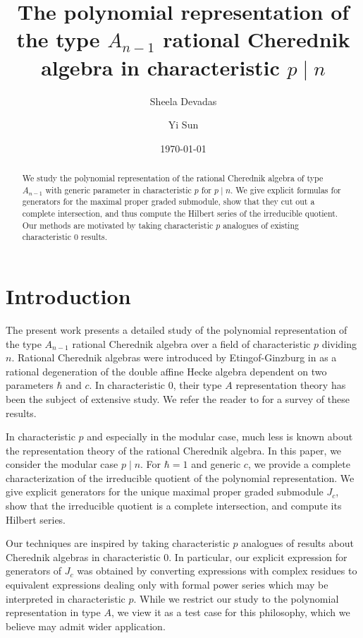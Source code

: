 \documentclass{amsart}
\numberwithin{equation}{section}
\theoremstyle{definition}
\begin{document}
\title[Polynomial representation of type $A_{n - 1}$ rational Cherednik algebra in characteristic $p \mid n$]{The polynomial representation of the type $A_{n - 1}$ rational Cherednik algebra in characteristic $p \mid n$}
\author{Sheela Devadas}
\author{Yi Sun}
\date{\today}

\begin{abstract}
We study the polynomial representation of the rational Cherednik algebra of type $A_{n-1}$ with generic parameter in characteristic $p$ for $p \mid n$. We give explicit formulas for generators for the maximal proper graded submodule, show that they cut out a complete intersection, and thus compute the Hilbert series of the irreducible quotient. Our methods are motivated by taking characteristic $p$ analogues of existing characteristic $0$ results.
\end{abstract}

\maketitle
\setcounter{tocdepth}{1}
\tableofcontents

\section{Introduction}

The present work presents a detailed study of the polynomial representation of the type $A_{n - 1}$ rational Cherednik algebra over a field of characteristic $p$ dividing $n$.  Rational Cherednik algebras were introduced by Etingof-Ginzburg in \cite{EG} as a rational degeneration of the double affine Hecke algebra dependent on two parameters $\hbar$ and $c$.  In characteristic $0$, their type $A$ representation theory has been the subject of extensive study.  We refer the reader to \cite{EM} for a survey of these results. 

In characteristic $p$ and especially in the modular case, much less is known about the representation theory of the rational Cherednik algebra.  In this paper, we consider the modular case $p \mid n$.  For $\hbar = 1$ and generic $c$, we provide a complete characterization of the irreducible quotient of the polynomial representation.  We give explicit generators for the unique maximal proper graded submodule $J_c$, show that the irreducible quotient is a complete intersection, and compute its Hilbert series.

Our techniques are inspired by taking characteristic $p$ analogues of results about Cherednik algebras in characteristic $0$.  In particular, our explicit expression for generators of $J_c$ was obtained by converting expressions with complex residues to equivalent expressions dealing only with formal power series which may be interpreted in characteristic $p$.  While we restrict our study to the polynomial representation in type $A$, we view it as a test case for this philosophy, which we believe may admit wider application.
\end{document}
